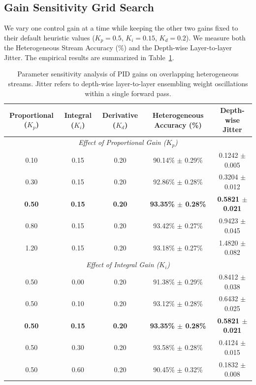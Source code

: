 \subsection{Gain Sensitivity Grid Search}
We vary one control gain at a time while keeping the other two gains fixed to their default heuristic values ($K_p = 0.5$, $K_i = 0.15$, $K_d = 0.2$). We measure both the Heterogeneous Stream Accuracy (\%) and the Depth-wise Layer-to-layer Jitter. The empirical results are summarized in Table~\ref{tab:sensitivity_sweep}.

\begin{table}[h]
\caption{Parameter sensitivity analysis of PID gains on overlapping heterogeneous streams. Jitter refers to depth-wise layer-to-layer ensembling weight oscillations within a single forward pass.}
\label{tab:sensitivity_sweep}
\vskip 0.15in
\begin{center}
\begin{small}
\begin{sc}
\begin{tabular}{ccccc}
\toprule
Proportional ($K_p$) & Integral ($K_i$) & Derivative ($K_d$) & Heterogeneous Accuracy (\%) & Depth-wise Jitter \\
\midrule
\multicolumn{5}{c}{\textit{Effect of Proportional Gain ($K_p$)}} \\
0.10 & 0.15 & 0.20 & 90.14\% $\pm$ 0.29\% & 0.1242 $\pm$ 0.005 \\
0.30 & 0.15 & 0.20 & 92.86\% $\pm$ 0.28\% & 0.3204 $\pm$ 0.012 \\
\textbf{0.50} & \textbf{0.15} & \textbf{0.20} & \textbf{93.35\% $\pm$ 0.28\%} & \textbf{0.5821 $\pm$ 0.021} \\
0.80 & 0.15 & 0.20 & 93.42\% $\pm$ 0.27\% & 0.9423 $\pm$ 0.045 \\
1.20 & 0.15 & 0.20 & 93.18\% $\pm$ 0.27\% & 1.4820 $\pm$ 0.082 \\
\midrule
\multicolumn{5}{c}{\textit{Effect of Integral Gain ($K_i$)}} \\
0.50 & 0.00 & 0.20 & 91.38\% $\pm$ 0.29\% & 0.8412 $\pm$ 0.038 \\
0.50 & 0.10 & 0.20 & 93.12\% $\pm$ 0.28\% & 0.6432 $\pm$ 0.025 \\
\textbf{0.50} & \textbf{0.15} & \textbf{0.20} & \textbf{93.35\% $\pm$ 0.28\%} & \textbf{0.5821 $\pm$ 0.021} \\
0.50 & 0.30 & 0.20 & 93.58\% $\pm$ 0.28\% & 0.4124 $\pm$ 0.015 \\
0.50 & 0.60 & 0.20 & 90.45\% $\pm$ 0.32\% & 0.1832 $\pm$ 0.008 \\

\end{tabular}
\end{sc}
\end{small}
\end{center}
\end{table}
